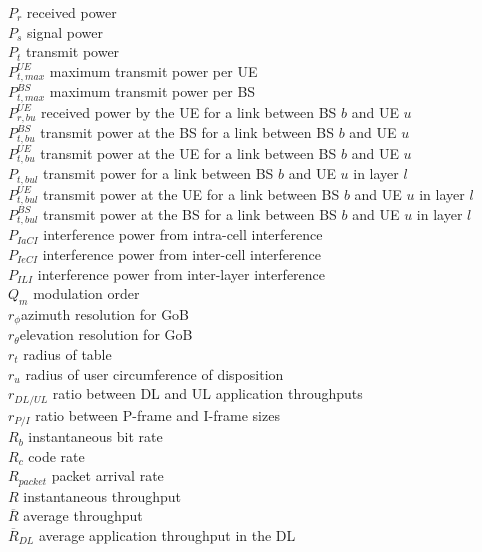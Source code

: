 $P_r$ \mytab received power \\
$P_s$ \mytab signal power \\
$P_t$ \mytab transmit power \\
$P_{t, max}^{UE}$ \mytab maximum transmit power per UE\\
$P_{t, max}^{BS}$ \mytab maximum transmit power per BS \\
$P_{r, bu}^{UE}$ \mytab received power by the UE for a link between BS $b$ and UE $u$ \\
$P_{t, bu}^{BS}$ \mytab transmit power at the BS for a link between BS $b$ and UE $u$ \\
$P_{t, bu}^{UE}$ \mytab transmit power at the UE for a link between BS $b$ and UE $u$ \\
$P_{t, bul}$ \mytab transmit power for a link between BS $b$ and UE $u$ in layer $l$ \\
$P_{t, bul}^{UE}$ \mytab transmit power at the UE for a link between BS $b$ and UE $u$ in layer $l$ \\
$P_{t, bul}^{BS}$ \mytab transmit power at the BS for a link between BS $b$ and UE $u$ in layer $l$ \\
$P_{IaCI}$ \mytab interference power from intra-cell interference \\
$P_{IeCI}$ \mytab interference power from inter-cell interference \\
$P_{ILI}$ \mytab interference power from inter-layer interference \\
$Q_m$ \mytab modulation order \\
$r_\phi$\mytab azimuth resolution for \acs{GoB} \\
$r_\theta$\mytab elevation resolution for \acs{GoB} \\
$r_t$ \mytab radius of table \\
$r_u$ \mytab radius of user circumference of disposition\\
$r_{DL/UL}$ \mytab ratio between \acs{DL} and \acs{UL} application throughputs\\
$r_{P/I}$ \mytab ratio between P-frame and I-frame sizes\\
$R_b$ \mytab instantaneous bit rate \\
$R_c$ \mytab code rate \\
$R_{packet}$ \mytab packet arrival rate \\
$R$ \mytab instantaneous throughput \\
$\overline{R}$ \mytab average throughput \\
$\overline{R}_{DL}$ \mytab average application throughput in the \acs{DL}\\
